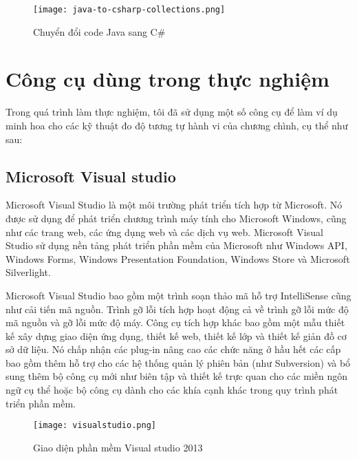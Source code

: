 \begin{center}
	\begin{figure}[htp]
		\begin{center}
			\texttt{[image: java-to-csharp-collections.png]}
		\end{center}
		\caption{Chuyển đổi code Java sang C\#}
		\label{refhinh1}
	\end{figure}
\end{center}

\section{Công cụ dùng trong thực nghiệm}

Trong quá trình làm thực nghiệm, tôi đã sử dụng một số công cụ để làm ví dụ minh hoa cho các kỹ thuật đo độ tương tự hành vi của chương chình, cụ thể như sau:

\subsection*{Microsoft Visual studio}
Microsoft Visual Studio là một môi trường phát triển tích hợp từ Microsoft. Nó được sử dụng để phát triển chương trình máy tính cho Microsoft Windows, cũng như các trang web, các ứng dụng web và các dịch vụ web. Microsoft Visual Studio sử dụng nền tảng phát triển phần mềm của Microsoft như Windows API, Windows Forms, Windows Presentation Foundation, Windows Store và Microsoft Silverlight. 

Microsoft Visual Studio bao gồm một trình soạn thảo mã hỗ trợ IntelliSense cũng như cải tiến mã nguồn. Trình gỡ lỗi tích hợp hoạt động cả về trình gỡ lỗi mức độ mã nguồn và gỡ lỗi mức độ máy. Công cụ tích hợp khác bao gồm một mẫu thiết kế xây dựng giao diện ứng dụng, thiết kế web, thiết kế lớp và thiết kế giản đồ cơ sở dữ liệu. Nó chấp nhận các plug-in nâng cao các chức năng ở hầu hết các cấp bao gồm thêm hỗ trợ cho các hệ thống quản lý phiên bản (như Subversion) và bổ sung thêm bộ công cụ mới như biên tập và thiết kế trực quan cho các miền ngôn ngữ cụ thể hoặc bộ công cụ dành cho các khía cạnh khác trong quy trình phát triển phần mềm.

\begin{center}
	\begin{figure}[htp]
		\begin{center}
			\texttt{[image: visualstudio.png]}
		\end{center}
		\caption{Giao diện phần mềm Visual studio 2013}
		\label{refhinh1}
	\end{figure}
\end{center}

